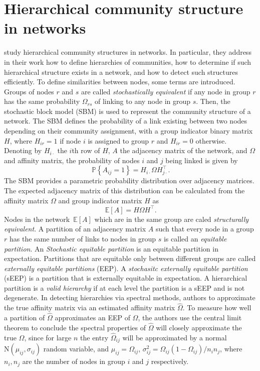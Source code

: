 \documentclass[letterpaper, 10 pt, conference]{article}
\newcommand\pr[1]{\, \mathbb{P} \left\lbrace #1 \right\rbrace}
\newcommand\expec[1]{\, \mathbb{E} \left\lbrack #1 \right\rbrack}
\begin{document}
\section{Hierarchical community structure in networks}\label{section:community}
\citet{schaub2020hierarchical} study hierarchical community structures in networks. In particular, they address in their work how to define hierarchies of communities, how to determine if such hierarchical structure exists in a network, and how to detect such structures efficiently. To define similarities between nodes, some terms are introduced. Groups of nodes $r$ and $s$ are called \textit{stochastically equivalent} if any node in group $r$ has the same probability $\Omega_{rs}$ of linking to any node in group $s$. Then, the stochastic block model (SBM) is used to represent the community structure of a network. The SBM defines the probability of a link existing between two nodes depending on their community assignment, with a group indicator binary matrix $H$, where $H_{ir} = 1$ if node $i$ is assigned to group $r$ and $H_{ir} = 0$ otherwise. Denoting by $H_{i \cdot}$ the $i$th row of $H$, $A$ the adjacency matrix of the network, and $\Omega$ and affinity matrix,  the probability of nodes $i$ and $j$ being linked is given by 
\begin{equation}
\pr{A_{ij} = 1} = H_{i \cdot} \Omega H_{j \cdot}^{\top}.
\end{equation}
The SBM provides a parametric probability distribution over adjacency matrices. The expected adjacency matrix of this distribution can be calculated from the affinity matrix $\Omega$ and group indicator matrix $H$ as 
\begin{equation}
	\expec{A} = H \Omega H^\top.
\end{equation}
Nodes in the network $\expec{A}$ which are in the same group are caled \textit{structurally equivalent}.  A partition of an adjacency matrix $A$ such that every node in a group $r$ has the same number of links to nodes in group $s$ is called an \textit{equitable partition}.  An \textit{Stochastic equitable partition} is an equitable partition in expectation. Partitions that are equitable only between different groups are called \textit{externally equitable partitions} (EEP). A \textit{stochasitc externally equitable partition} (sEEP) is a partition that is externally equitable in expectation.  A hierarchical partition is a \textit{valid hierarchy} if at each level the partition is a sEEP and is not degenerate.  
In detecting hierarchies via spectral methods, authors to approximate the true affinity matrix via an estimated affinity matrix $\hat{\Omega}$.
To measure how well a partition of $\hat{\Omega}$ approximates an EEP of $\Omega$, the authors use the central limit theorem to conclude the spectral properties of $\hat{\Omega}$ will closely approximate the true $\Omega$, since for large $n$ the entry $\hat{\Omega}_{ij}$ will be approximated by a normal $\mathrm{N}(\mu_{ij}, \sigma_{ij})$ random variable, and $\mu_{ij} = \Omega_{ij}$, $\sigma^{2}_{ij} = \Omega_{ij} (1-\Omega_{ij}) / n_i n_j$, where $n_i, n_j$ are the number of nodes in group $i$ and $j$ respectively.  
\end{document}
